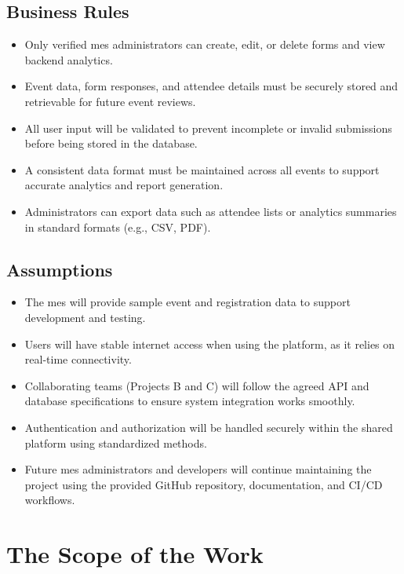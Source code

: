 \documentclass[12pt]{article}
\begin{document}
\subsection{Business Rules}

\begin{itemize}
    \item Only verified \gls{mes} administrators can create, edit, or delete forms and view backend analytics.
    \item Event data, form responses, and attendee details must be securely stored and retrievable for future event
      reviews.
    \item All user input will be validated to prevent incomplete or invalid submissions before being stored in the
      database.
    \item A consistent data format must be maintained across all events to support accurate analytics and report
      generation.
    \item Administrators can export data such as attendee lists or analytics summaries in standard formats (e.g., CSV,
      PDF).
\end{itemize}

\subsection{Assumptions}

\begin{itemize}
    \item The \gls{mes} will provide sample event and registration data to support development and testing.
    \item Users will have stable internet access when using the platform, as it relies on real-time connectivity.
    \item Collaborating teams (Projects B and C) will follow the agreed API and database specifications to ensure system
      integration works smoothly.
    \item Authentication and authorization will be handled securely within the shared platform using standardized
      methods.
    \item Future \gls{mes} administrators and developers will continue maintaining the project using the provided GitHub
      repository, documentation, and CI/CD workflows.
\end{itemize}

\section{The Scope of the Work}
\end{document}
